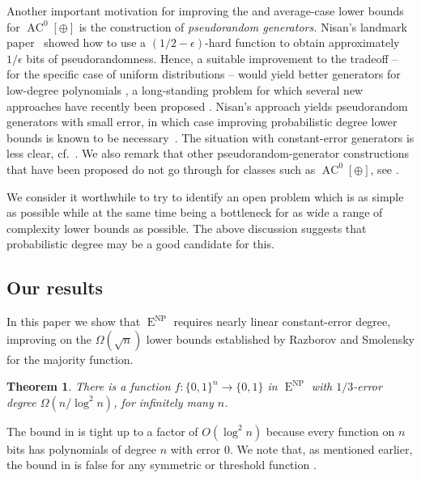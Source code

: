 \documentclass{toc}
\newtheorem{thm}[theorem]{Theorem}
\DeclareMathOperator{\AC}{\mathrm{AC}}  %
\DeclareMathOperator{\NP}{\mathrm{NP}}  %
\DeclareMathOperator{\EEE}{\mathrm{E}}  %
\newcommand{\zo}{\{0, 1\}}
\newcommand{\e}{\epsilon}
\begin{document}
Another important motivation for improving the 
and average-case lower bounds for $\AC^{0}[\oplus]$ is the construction
of \emph{pseudorandom generators.} Nisan's landmark paper~\cite{Nis91}
showed how to use a $(1/2-\e)$-hard function to obtain approximately
$1/\e$ bits of pseudorandomness. Hence, a suitable improvement to
the tradeoff -- for the specific case of uniform distributions --
would yield better generators for low-degree polynomials \cite{BoV-gen,Lov09,Viola-d},
a long-standing problem for which several new approaches have recently
been proposed \cite{DBLP:conf/coco/ChattopadhyayHH18,DBLP:conf/innovations/ChattopadhyayHL19,DBLP:journals/corr/abs-2008-01316,Viola-L12requiresCor}.
Nisan's approach yields pseudorandom generators with small error,
in which case improving probabilistic degree lower bounds is known
to be necessary~\cite{Viola-d}. The situation with constant-error
generators is less clear, cf.~\cite{viola-PRG-requires-MAJ}. We
also remark that other pseudorandom-generator constructions that have
been proposed do not go through for classes such as $\AC^{0}[\oplus]$,
see \cite{ShV-dec,GrinbergSV-adaptivemajority,viola-PRG-requires-MAJ}.

\medskip

We consider it worthwhile to try to identify an open problem which
is as simple as possible while at the same time being a bottleneck
for as wide a range of complexity lower bounds as possible. The above
discussion suggests that probabilistic degree may be a good candidate
for this.

\subsection{Our results}

In this %
paper  %
we show that $\EEE^{\NP}$ requires %
nearly linear %
constant-error
degree, improving on the $\Omega(\sqrt{n})$ lower bounds established
by Razborov and Smolensky \cite{Raz87,Smo87,Smolensky93} for the
majority function.
\begin{thm}
\label{thm:prob-degree-lower-bound}There is a function $f:\zo^{n}\to\zo$
in $\EEE^{\NP}$ with $1/3$-error degree $\Omega(n/\log^{2}n)$, for
infinitely many $n$.
\end{thm}

The bound in  is tight up
to a factor of $O(\log^{2}n)$ because every function on $n$ bits
has polynomials of degree $n$ with error $0$. We note that, as mentioned
earlier, the bound in  is
false for any symmetric or threshold function
\cite{DBLP:conf/fsttcs/Srinivasan13,DBLP:conf/focs/AlmanW15}.
\end{document}
